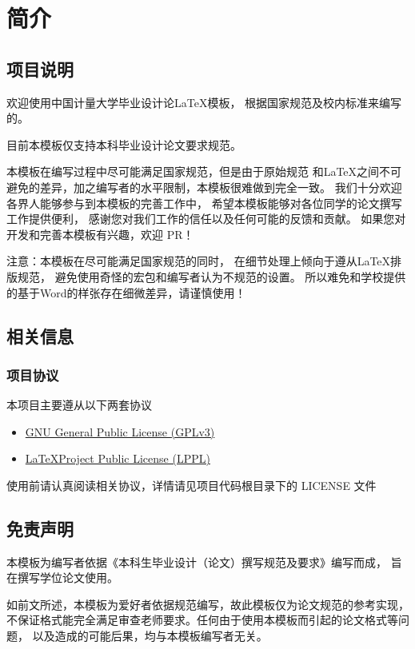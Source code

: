 \chapter{简介}

\section{项目说明}

欢迎使用中国计量大学毕业设计论\LaTeX 模板，
根据国家规范及校内标准来编写的。

{\heiti 目前本模板仅支持本科毕业设计论文要求规范。}

本模板在编写过程中尽可能满足国家规范，但是由于原始规范
和\LaTeX 之间不可避免的差异，加之编写者的水平限制，本模板很难做到完全一致。
我们十分欢迎各界人能够参与到本模板的完善工作中，
希望本模板能够对各位同学的论文撰写工作提供便利，
感谢您对我们工作的信任以及任何可能的反馈和贡献。
如果您对开发和完善本模板有兴趣，欢迎 PR！

{\heiti 注意：}本模板在尽可能满足国家规范的同时，
在细节处理上倾向于遵从\LaTeX 排版规范，
避免使用奇怪的宏包和编写者认为不规范的设置。
所以难免和学校提供的基于Word的样张存在细微差异，请谨慎使用！

\section{相关信息}

\subsection{项目协议}
本项目主要遵从以下两套协议
\begin{itemize}
    \item \href{http://www.gnu.org/licenses/gpl.txt}
        {GNU General Public License (GPLv3)}
    \item \href{http://www.latex-project.org/lppl.txt}
        {\LaTeX  Project Public License (LPPL)}
\end{itemize}
使用前请认真阅读相关协议，详情请见项目代码根目录下的 LICENSE 文件

\section{免责声明}
本模板为编写者依据《本科生毕业设计（论文）撰写规范及要求》编写而成，
旨在撰写学位论文使用。

如前文所述，本模板为爱好者依据规范编写，故此模板仅为论文规范的参考实现，
不保证格式能完全满足审查老师要求。任何由于使用本模板而引起的论文格式等问题，
以及造成的可能后果，均与本模板编写者无关。

